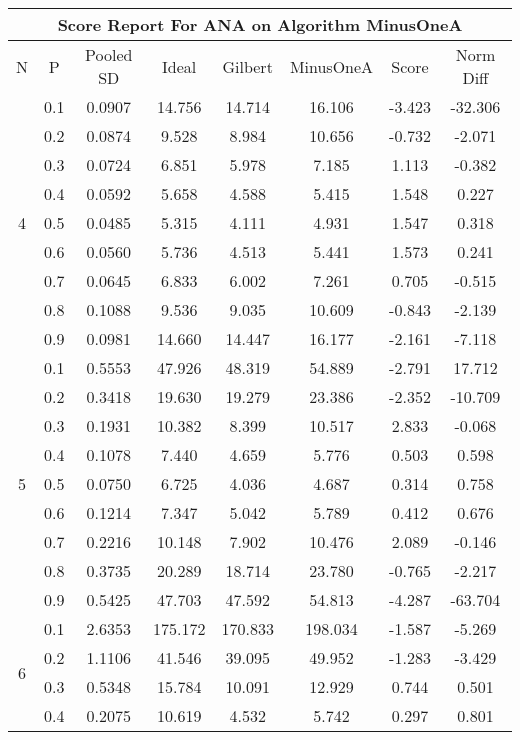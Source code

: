 \documentclass[11pt,a4paper]{report}
\begin{document}
\begin{longtable}{ | c | c || c | c | c | c | c | c | }
\hline
\multicolumn{8}{|c|}{ Score Report For ANA on Algorithm MinusOneA} \\
\hline
N & P & Pooled SD &  Ideal &  Gilbert & MinusOneA  & Score & Norm Diff \\
 \hline
 \hline
 \endhead
\multirow{9}{*}{4} & 0.1 & 0.0907 & 14.756 & 14.714 & 16.106 & -3.423 & -32.306 \\
 & 0.2 & 0.0874 & 9.528 & 8.984 & 10.656 & -0.732 & -2.071 \\
 & 0.3 & 0.0724 & 6.851 & 5.978 & 7.185 & 1.113 & -0.382 \\
 & 0.4 & 0.0592 & 5.658 & 4.588 & 5.415 & 1.548 & 0.227 \\
 & 0.5 & 0.0485 & 5.315 & 4.111 & 4.931 & 1.547 & 0.318 \\
 & 0.6 & 0.0560 & 5.736 & 4.513 & 5.441 & 1.573 & 0.241 \\
 & 0.7 & 0.0645 & 6.833 & 6.002 & 7.261 & 0.705 & -0.515 \\
 & 0.8 & 0.1088 & 9.536 & 9.035 & 10.609 & -0.843 & -2.139 \\
 & 0.9 & 0.0981 & 14.660 & 14.447 & 16.177 & -2.161 & -7.118 \\
 \hline
\multirow{9}{*}{5} & 0.1 & 0.5553 & 47.926 & 48.319 & 54.889 & -2.791 & 17.712 \\
 & 0.2 & 0.3418 & 19.630 & 19.279 & 23.386 & -2.352 & -10.709 \\
 & 0.3 & 0.1931 & 10.382 & 8.399 & 10.517 & 2.833 & -0.068 \\
 & 0.4 & 0.1078 & 7.440 & 4.659 & 5.776 & 0.503 & 0.598 \\
 & 0.5 & 0.0750 & 6.725 & 4.036 & 4.687 & 0.314 & 0.758 \\
 & 0.6 & 0.1214 & 7.347 & 5.042 & 5.789 & 0.412 & 0.676 \\
 & 0.7 & 0.2216 & 10.148 & 7.902 & 10.476 & 2.089 & -0.146 \\
 & 0.8 & 0.3735 & 20.289 & 18.714 & 23.780 & -0.765 & -2.217 \\
 & 0.9 & 0.5425 & 47.703 & 47.592 & 54.813 & -4.287 & -63.704 \\
 \hline
\multirow{9}{*}{6} & 0.1 & 2.6353 & 175.172 & 170.833 & 198.034 & -1.587 & -5.269 \\
 & 0.2 & 1.1106 & 41.546 & 39.095 & 49.952 & -1.283 & -3.429 \\
 & 0.3 & 0.5348 & 15.784 & 10.091 & 12.929 & 0.744 & 0.501 \\
 & 0.4 & 0.2075 & 10.619 & 4.532 & 5.742 & 0.297 & 0.801 \\

\end{longtable}
\end{document}
